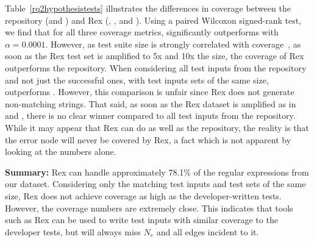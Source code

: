 Table~\ref{rq2hypothesistests} illustrates the differences in coverage between the repository (\RepoTwoS and \RepoTwoT) and Rex (\RexSOne, \RexSFive, and \RexSTen). Using a paired Wilcoxon signed-rank test, we find that for all three coverage metrics, \RepoTwoS significantly outperforms \RexSOne  with $\alpha = 0.0001$. However, as test suite size is strongly correlated with coverage~\cite{coveragetestsuitecorrelation}, as soon as the Rex test set is amplified to 5x and 10x the size, the coverage of Rex outperforms the repository. 
When considering all test inputs from the repository and not just the successful ones, with test inputs sets of the same size, \RepoTwoT outperforms \RexSOne. However,  this comparison is unfair since Rex does not generate non-matching strings. That said, as soon as the Rex dataset is amplified as in \RexSFive and \RexSTen, there is no clear winner compared to all test inputs from the repository. 
While it may appear that Rex can do as well as the repository, the reality is that the error node will never be covered by Rex, a fact which is not apparent by looking at the numbers alone.  




\textbf{Summary:}
Rex can handle approximately 78.1\% of the regular expressions from our dataset. %
Considering only the matching test inputs and test sets of the same size, Rex does not achieve coverage as high as the developer-written tests. However, the coverage numbers are extremely close. This indicates that tools such as Rex can be used to write test inputs with similar coverage to the developer tests, but will always miss $N_e$ and all edges incident to it. 

